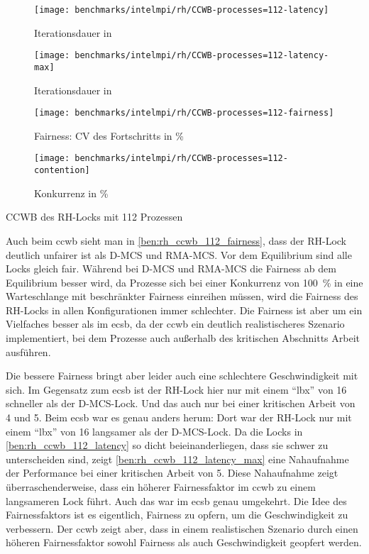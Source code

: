 \begin{benchmark}[h]
    \begin{subfigure}{.5\textwidth}
        \texttt{[image: benchmarks/intelmpi/rh/CCWB-processes=112-latency]}
        \caption{Iterationsdauer in }
        \label{ben:rh_ccwb_112_latency}
    \end{subfigure}
    \begin{subfigure}{.5\textwidth}
        \texttt{[image: benchmarks/intelmpi/rh/CCWB-processes=112-latency-max]}
        \caption{Iterationsdauer in }
        \label{ben:rh_ccwb_112_latency_max}
    \end{subfigure}
    \begin{subfigure}{.5\textwidth}
        \texttt{[image: benchmarks/intelmpi/rh/CCWB-processes=112-fairness]}
        \caption{Fairness: CV des Fortschritts in \%}
        \label{ben:rh_ccwb_112_fairness}
    \end{subfigure}
    \begin{subfigure}{.5\textwidth}
        \texttt{[image: benchmarks/intelmpi/rh/CCWB-processes=112-contention]}
        \caption{Konkurrenz in \%}
        \label{ben:rh_ccwb_112_contention}
    \end{subfigure}
    \caption{CCWB des RH-Locks mit 112 Prozessen}
    \label{ben:rh_ccwb_112}
\end{benchmark}

Auch beim \gls{ccwb} sieht man in \autoref{ben:rh_ccwb_112_fairness},
dass der RH-Lock deutlich unfairer ist
als D-MCS und RMA-MCS.
Vor dem Equilibrium sind alle Locks gleich fair.
Während bei D-MCS und RMA-MCS die Fairness ab dem Equilibrium besser wird,
da Prozesse sich bei einer \gls{Konkurrenz} von 100~\% in eine Warteschlange mit beschränkter Fairness einreihen müssen,
wird die Fairness des RH-Locks in allen Konfigurationen immer schlechter.
Die Fairness ist aber um ein Vielfaches besser
als im \gls{ecsb},
da der \gls{ccwb} ein deutlich realistischeres Szenario implementiert,
bei dem Prozesse auch außerhalb des kritischen Abschnitts Arbeit ausführen.

Die bessere Fairness bringt aber leider auch eine schlechtere Geschwindigkeit mit sich.
Im Gegensatz zum \gls{ecsb} ist der RH-Lock hier nur mit einem \enquote{lbx} von 16 schneller
als der D-MCS-Lock.
Und das auch nur bei einer kritischen Arbeit von 4 und 5.
Beim \gls{ecsb} war es genau anders herum:
Dort war der RH-Lock nur mit einem \enquote{lbx} von 16 langsamer als der D-MCS-Lock.
Da die Locks in \autoref{ben:rh_ccwb_112_latency} so dicht beieinanderliegen,
dass sie schwer zu unterscheiden sind,
zeigt \autoref{ben:rh_ccwb_112_latency_max} eine Nahaufnahme der Performance bei einer kritischen Arbeit von 5.
Diese Nahaufnahme zeigt überraschenderweise,
dass ein höherer Fairnessfaktor im \gls{ccwb} zu einem langsameren Lock führt.
Auch das war im \gls{ecsb} genau umgekehrt.
Die Idee des Fairnessfaktors ist es eigentlich,
Fairness zu opfern,
um die Geschwindigkeit zu verbessern.
Der \gls{ccwb} zeigt aber,
dass in einem realistischen Szenario durch einen höheren Fairnessfaktor sowohl Fairness
als auch Geschwindigkeit geopfert werden.

